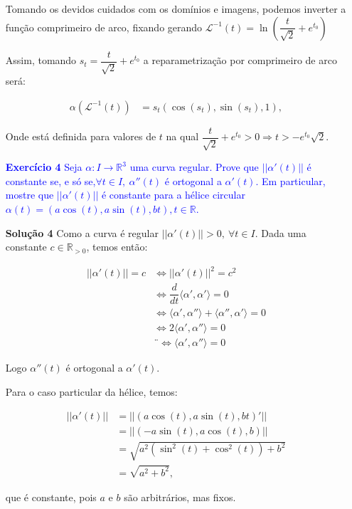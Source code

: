 \documentclass[12pt,letterpaper]{article}
\newcommand\lcur{\mathcal{L}}
\newcommand{\real}{\mathbb{R}}
\newcommand{\rpos}{\mathbb{R}_{>0}}
\newcommand{\ex}[1]{\textcolor{blue}{\textbf{Exercício #1}}}
\newcommand{\sol}[1]{\textbf{Solução #1}}
\begin{document}
\begin{enumerate}
		Tomando os devidos cuidados com os domínios e imagens, podemos inverter a função comprimeiro de arco, fixando  gerando $\lcur^{-1}(t)=\ln\left(\dfrac{t}{\sqrt2}+e^{t_0}\right)$
		
		Assim, tomando $s_t=\dfrac{t}{\sqrt2}+e^{t_0}$ a reparametrização por comprimeiro de arco será:
		
		\begin{align*}
			\alpha(\lcur^{-1}(t))&=s_t\left(\cos\left(s_t\right),\sin\left(s_t\right),1\right),
		\end{align*}
	
	Onde está definida para valores de $t$ na qual $\dfrac{t}{\sqrt2}+e^{t_0}>0\Rightarrow t>-e^{t_0}\sqrt2$.
	
	\item[\ex{4}]\textcolor{blue}{Seja $\alpha:I\to\real^3$ uma curva regular. Prove que $||\alpha'(t)||$ é constante se, e só se,$\forall t \in I, ~\alpha''(t)$ é ortogonal a $\alpha'(t)$. Em particular, mostre que $||\alpha'(t)||$ é constante para a hélice circular $\alpha(t) = (a\cos(t),a\sin(t),bt),t\in\real$.}
	
	\item[\sol{4}] Como a curva é regular $||\alpha'(t)||>0, ~\forall t\in I$. Dada uma constante $c\in\rpos$, temos então:
	
	\begin{align*}
		||\alpha'(t)||=c&\Leftrightarrow||\alpha'(t)||^2=c^2\\
		&\Leftrightarrow \dfrac{d}{dt}\langle\alpha',\alpha'\rangle=0\\
		&\Leftrightarrow\langle\alpha',\alpha''\rangle+\langle\alpha'',\alpha'\rangle=0\\
		&\Leftrightarrow2\langle\alpha',\alpha''\rangle=0\\
		&¨\Leftrightarrow\langle\alpha',\alpha''\rangle=0
	\end{align*}

	Logo $\alpha''(t)$ é ortogonal a $\alpha'(t)$.
	
	Para o caso particular da hélice, temos:
	
	\begin{align*}
		||\alpha'(t)||&=||(a\cos(t),a\sin(t),bt)'||\\
		&=||(-a\sin(t),a\cos(t),b)||\\
		&=\sqrt{a^2(\sin^2(t)+\cos^2(t))+b^2}\\
		&=\sqrt{a^2+b^2},
	\end{align*}
	
	que é constante, pois $a$ e $b$ são arbitrários, mas fixos.


\end{enumerate}
\end{document}
